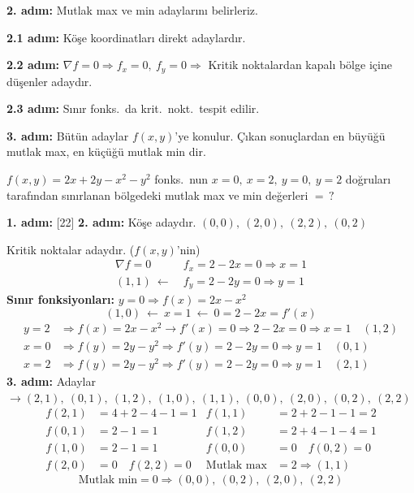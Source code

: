 \documentclass[11pt,a4paper]{article}
\begin{document}
\noindent\textbf{2. adım:} Mutlak max ve min adaylarını belirleriz.

\noindent\textbf{2.1 adım:} Köşe koordinatları direkt adaylardır.

\noindent\textbf{2.2 adım:} $\nabla f=0\Longrightarrow f_x=0,\ f_y=0\Longrightarrow$ Kritik noktalardan kapalı bölge içine düşenler adaydır.

\noindent\textbf{2.3 adım:} Sınır fonks.\ da krit.\ nokt.\ tespit edilir.

\noindent\textbf{3. adım:} Bütün adaylar $f(x,y)$'ye konulur. Çıkan sonuçlardan en büyüğü mutlak max, en küçüğü mutlak min dir.

\begin{ornek}
$f(x,y)=2x+2y-x^2-y^2$ fonks.\ nun $x=0,\ x=2,\ y=0,\ y=2$ doğruları tarafından sınırlanan bölgedeki mutlak max ve min değerleri $=\,?$
\end{ornek}
\noindent\textbf{1. adım:}
[22]
\noindent\textbf{2. adım:} Köşe adaydır. \quad $(0,0),\ (2,0),\ (2,2),\ (0,2)$

Kritik noktalar adaydır. ($f(x,y)$'nin)
\begin{align*}
\nabla f=0\qquad &f_x=2-2x=0\Longrightarrow x=1\\
(1,1)\ \longleftarrow\ &f_y=2-2y=0\Longrightarrow y=1
\end{align*}
\noindent\textbf{Sınır fonksiyonları:} $y=0\Longrightarrow f(x)=2x-x^2$
\[ (1,0)\ \longleftarrow\ x=1\ \longleftarrow\ 0=2-2x=f'(x) \]
\begin{align*}
y=2&\Longrightarrow f(x)=2x-x^2\longrightarrow f'(x)=0\Longrightarrow 2-2x=0\Longrightarrow x=1\quad (1,2)\\
x=0&\Longrightarrow f(y)=2y-y^2\Longrightarrow f'(y)=2-2y=0\Longrightarrow y=1\quad (0,1)\\
x=2&\Longrightarrow f(y)=2y-y^2\Longrightarrow f'(y)=2-2y=0\Longrightarrow y=1\quad (2,1)
\end{align*}
\noindent\textbf{3. adım:} Adaylar $\longrightarrow (2,1),\ (0,1),\ (1,2),\ (1,0),\ (1,1),\ (0,0),\ (2,0),\ (0,2),\ (2,2)$
\begin{align*}
f(2,1)&=4+2-4-1=1 & f(1,1)&=2+2-1-1=2\\
f(0,1)&=2-1=1 & f(1,2)&=2+4-1-4=1\\
f(1,0)&=2-1=1 & f(0,0)&=0\quad f(0,2)=0\\
f(2,0)&=0\quad f(2,2)=0 & \text{Mutlak max}&=2\Longrightarrow (1,1)
\end{align*}
\[ \text{Mutlak min}=0\Longrightarrow (0,0),\ (0,2),\ (2,0),\ (2,2) \]
\end{document}
